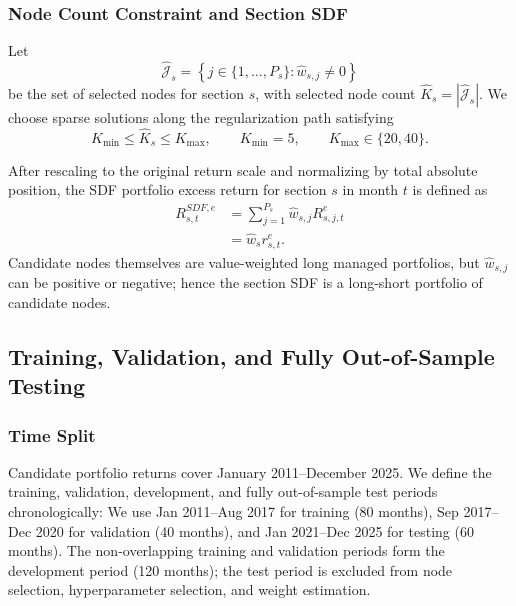 \documentclass[12pt]{article}
\def\bm#1{#1}%
\def\mathrm#1{#1}%
\def\top{}%
\begin{document}
\subsubsection{Node Count Constraint and Section SDF}

Let
\begin{equation}
  \widehat{\mathcal J}_s
  =
  \left\{
    j\in\{1,\ldots,P_s\}:
    \widehat w_{s,j}\neq0
  \right\}
  \label{eq:selected_node_set}
\end{equation}
be the set of selected nodes for section \(s\), with selected node count \(\widehat K_s=|\widehat{\mathcal J}_s|\). We choose sparse solutions along the regularization path satisfying
\begin{equation}
  K_{\min}\leq\widehat K_s\leq K_{\max},
  \qquad
  K_{\min}=5,
  \qquad
  K_{\max}\in\{20,40\}.
  \label{eq:node_number_constraint}
\end{equation}

After rescaling to the original return scale and normalizing by total absolute position, the SDF portfolio excess return for section \(s\) in month \(t\) is defined as
\begin{equation}
  \begin{aligned}
  R_{s,t}^{\mathrm{SDF},e}
  &=
  \sum_{j=1}^{P_s}
  \widehat w_{s,j}R_{s,j,t}^{e}\\
  &=
  \widehat{\bm w}_{s}^{\top}\bm r_{s,t}^{e}.
  \end{aligned}
  \label{eq:section_sdf_return}
\end{equation}
Candidate nodes themselves are value-weighted long managed portfolios, but \(\widehat w_{s,j}\) can be positive or negative; hence the section SDF is a long-short portfolio of candidate nodes.

\subsection{Training, Validation, and Fully Out-of-Sample Testing}
\label{subsec:train_validation_test}

\subsubsection{Time Split}

Candidate portfolio returns cover January 2011–December 2025. We define the training, validation, development, and fully out-of-sample test periods chronologically:
We use Jan 2011--Aug 2017 for training (80 months), Sep 2017--Dec 2020
for validation (40 months), and Jan 2021--Dec 2025 for testing (60 months).
The non-overlapping training and validation periods form the development
period (120 months); the test period is excluded from node selection,
hyperparameter selection, and weight estimation.
\end{document}
